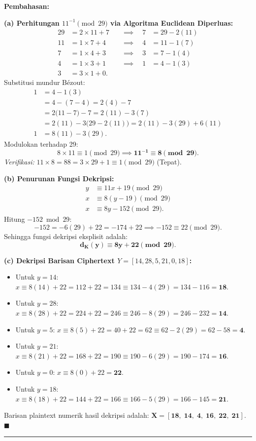 \documentclass[11pt,a4paper]{article}
\newenvironment{solusi}{\noindent\textbf{\textsf{Pembahasan:}}\par\vspace{0.2em}}{\hfill$\blacksquare$\vspace{1em}\par\hrule\vspace{1em}}
\begin{document}
\begin{solusi}
\textbf{(a) Perhitungan $11^{-1} \pmod{29}$ via Algoritma Euclidean Diperluas:}
\begin{align*}
29 &= 2 \times 11 + 7 \quad &\implies \quad 7 &= 29 - 2(11) \\
11 &= 1 \times 7 + 4 \quad &\implies \quad 4 &= 11 - 1(7) \\
7 &= 1 \times 4 + 3 \quad &\implies \quad 3 &= 7 - 1(4) \\
4 &= 1 \times 3 + 1 \quad &\implies \quad 1 &= 4 - 1(3) \\
3 &= 3 \times 1 + 0.
\end{align*}
Substitusi mundur Bézout:
\begin{align*}
1 &= 4 - 1(3) \\
&= 4 - (7 - 4) = 2(4) - 7 \\
&= 2\big(11 - 7\big) - 7 = 2(11) - 3(7) \\
&= 2(11) - 3\big(29 - 2(11)\big) = 2(11) - 3(29) + 6(11) \\
1 &= 8(11) - 3(29).
\end{align*}
Modulokan terhadap 29:
\[
8 \times 11 \equiv 1 \pmod{29} \implies \mathbf{11^{-1} \equiv 8 \pmod{29}}.
\]
\textit{Verifikasi:} $11 \times 8 = 88 = 3 \times 29 + 1 \equiv 1 \pmod{29}$ (Tepat).

\vspace{0.2cm}
\textbf{(b) Penurunan Fungsi Dekripsi:}
\begin{align*}
y &\equiv 11x + 19 \pmod{29} \\
x &\equiv 8(y - 19) \pmod{29} \\
x &\equiv 8y - 152 \pmod{29}.
\end{align*}
Hitung $-152 \bmod 29$:
\[
-152 = -6(29) + 22 = -174 + 22 \implies -152 \equiv 22 \pmod{29}.
\]
Sehingga fungsi dekripsi eksplisit adalah:
\[
\mathbf{d_K(y) \equiv 8y + 22 \pmod{29}}.
\]

\vspace{0.2cm}
\textbf{(c) Dekripsi Barisan Ciphertext $Y = [14, 28, 5, 21, 0, 18]$:}
\begin{itemize}[leftmargin=*]
    \item Untuk $y = 14$: $x \equiv 8(14) + 22 = 112 + 22 = 134 \equiv 134 - 4(29) = 134 - 116 = \mathbf{18}$.
    \item Untuk $y = 28$: $x \equiv 8(28) + 22 = 224 + 22 = 246 \equiv 246 - 8(29) = 246 - 232 = \mathbf{14}$.
    \item Untuk $y = 5$: $x \equiv 8(5) + 22 = 40 + 22 = 62 \equiv 62 - 2(29) = 62 - 58 = \mathbf{4}$.
    \item Untuk $y = 21$: $x \equiv 8(21) + 22 = 168 + 22 = 190 \equiv 190 - 6(29) = 190 - 174 = \mathbf{16}$.
    \item Untuk $y = 0$: $x \equiv 8(0) + 22 = \mathbf{22}$.
    \item Untuk $y = 18$: $x \equiv 8(18) + 22 = 144 + 22 = 166 \equiv 166 - 5(29) = 166 - 145 = \mathbf{21}$.
\end{itemize}
Barisan plaintext numerik hasil dekripsi adalah: $\mathbf{X = [18, \; 14, \; 4, \; 16, \; 22, \; 21]}$.
\end{solusi}
\end{document}
